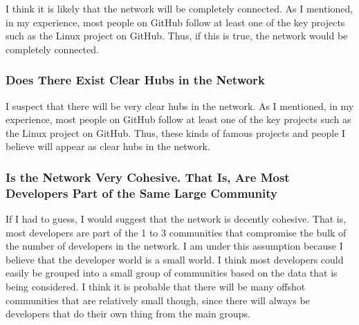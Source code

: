 \documentclass[9pt,twocolumn,twoside]{pnas-new}
\begin{document}
I think it is likely that the network will be completely connected. As I mentioned, in my experience, most people on GitHub follow at least one of the key projects such as the Linux project on GitHub. Thus, if this is true, the network would be completely connected.

\subsubsection{Does There Exist Clear Hubs in the Network}

I suspect that there will be very clear hubs in the network. As I mentioned, in my experience, most people on GitHub follow at least one of the key projects such as the Linux project on GitHub. Thus, these kinds of famous projects and people I believe will appear as clear hubs in the network.

\subsubsection{Is the Network Very Cohesive. That Is, Are Most Developers Part of the Same Large Community}

If I had to guess, I would suggest that the network is decently cohesive. That is, most developers are part of the 1 to 3 communities that compromise the bulk of the number of developers in the network. I am under this assumption because I believe that the developer world is a small world. I think most developers could easily be grouped into a small group of communities based on the data that is being considered. I think it is probable that there will be many offshot communities that are relatively small though, since there will always be developers that do their own thing from the main groups.
\end{document}

